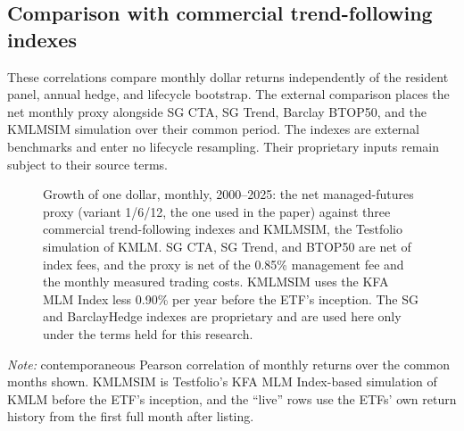 \subsection{Comparison with commercial trend-following indexes}
\label{app:mf-external}
These correlations compare monthly dollar returns independently of the
resident panel, annual hedge, and lifecycle bootstrap.
The external comparison places the net monthly proxy alongside
SG CTA, SG Trend, Barclay BTOP50, and the KMLMSIM simulation over their
common period. The indexes are external benchmarks and enter no lifecycle
resampling. Their proprietary inputs remain subject to their source terms.

\begin{figure}[H]
\centering

\caption{Growth of one dollar, monthly, 2000--2025: the net managed-futures
proxy (variant 1/6/12, the one used in the paper) against three commercial
trend-following indexes and KMLMSIM, the Testfolio simulation of KMLM. SG CTA,
SG Trend, and BTOP50 are net of index fees, and the proxy is net of the 0.85\%
management fee and the monthly measured trading costs. KMLMSIM uses the KFA MLM Index less
0.90\% per year before the ETF's inception. The SG and BarclayHedge indexes are
proprietary and are used here only under the terms held for this research.}
\label{fig:mf-vs-benchmarks}
\end{figure}

\begin{table}[H]
\centering
\caption{Monthly correlation of the net proxy with trend-following benchmarks}
\label{tab:mf-benchmark-corr}
\small

\begin{minipage}{0.86\textwidth}\footnotesize
\textit{Note:} contemporaneous Pearson correlation of monthly returns over the
common months shown. KMLMSIM is Testfolio's KFA MLM Index-based simulation of
KMLM before the ETF's inception, and the ``live'' rows use the ETFs' own return
history from the first full month after listing.
\end{minipage}
\end{table}


